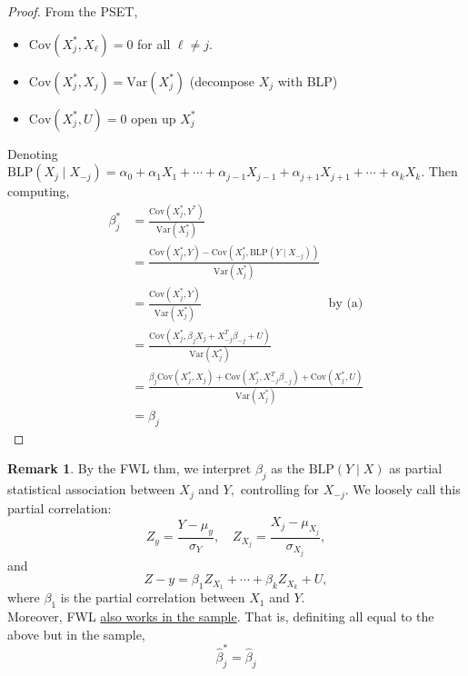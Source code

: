 \documentclass[10pt, oneside]{article}
\newcommand{\Var}{\text{Var}}
\newcommand{\Cov}{\text{Cov}}
\theoremstyle{definition}
\newtheorem{rem}{Remark}
\begin{document}
\begin{proof}
    From the PSET,
    \begin{itemize}
        \item  $\Cov(X_j^*, X_\ell) = 0$ for all $\ell \neq j$. 
        \item $\Cov(X_j^*, X_j) = \Var(X_j^*)$ (decompose $X_j$ with BLP)
        \item $\Cov(X_j^*, U) = 0$ open up $X_j^*$
    \end{itemize}
    Denoting $\text{BLP}(X_j \mid X_{-j}) = \alpha_0 + \alpha_1 X_1 + \cdots + \alpha_{j-1}X_{j-1} + \alpha_{j+1}X_{j+1} + \cdots + \alpha_k X_k.$ Then computing,
    \begin{align*}
      \beta_j^* &= \frac{\Cov(X_j^*, Y^*)}{\Var(X_j^*)} \\
      &= \frac{\Cov(X_j^*, Y) - \Cov(X_j^*, \text{BLP}(Y \mid X_{-j}))}{\Var(X_j^*)}\\
      &= \frac{\Cov(X_j^*, Y)}{\Var(X_j^*)}\qquad \qquad \qquad \qquad\qquad\text{by (a)}\\
      &= \frac{\Cov(X_j^*, \beta_jX_j + X_{-j}^T \beta_{-j} + U)}{\Var(X_j^*)}\\
      &= \frac{\beta_j \Cov(X_j^*, X_j) + \Cov(X_j^*, X_{-j}^T \beta_{-j}) + \Cov(X_j^*, U)}{\Var(X_j^*)}\\
      &= \beta_j
    \end{align*}
    
\end{proof}
\begin{rem}
    By the FWL thm, we interpret $\beta_j$ as the $\text{BLP}(Y \mid X)$ as partial statistical association between $X_j$ and $Y,$ controlling for $X_{-j}.$ We loosely call this partial correlation:
    \[Z_y = \frac{Y - \mu_y}{\sigma_Y}, \quad Z_{X_j} = \frac{X_j - \mu_{X_j}}{\sigma_{{X_j}}},\] and 
    \[Z-y= \beta_1 Z_{X_1} + \cdots + \beta_k Z_{X_k} + U,\] where $\beta_1$ is the partial correlation between $X_1$ and $Y.$\\

    Moreover, FWL \underline{also works in the sample}. That is, definiting all equal to the above but in the sample, 
    \[\hat\beta_j^* = \hat\beta_j\]
\end{rem}
\end{document}
